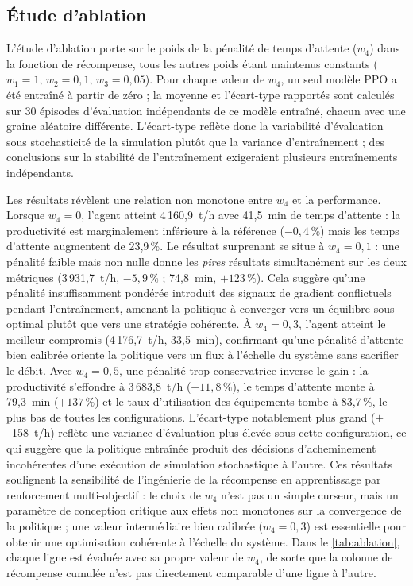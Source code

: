 \documentclass[11pt,a4paper]{article}
\begin{document}
\subsection{Étude d'ablation}
\label{sec:ablation}

L'étude d'ablation porte sur le poids de la pénalité de temps d'attente ($w_4$) dans la fonction de récompense, tous les autres poids étant maintenus constants ($w_1 = 1$, $w_2 = 0{,}1$, $w_3 = 0{,}05$). Pour chaque valeur de $w_4$, un seul modèle PPO a été entraîné à partir de zéro ; la moyenne et l'écart-type rapportés sont calculés sur 30 épisodes d'évaluation indépendants de ce modèle entraîné, chacun avec une graine aléatoire différente. L'écart-type reflète donc la variabilité d'évaluation sous stochasticité de la simulation plutôt que la variance d'entraînement ; des conclusions sur la stabilité de l'entraînement exigeraient plusieurs entraînements indépendants.

Les résultats révèlent une relation non monotone entre $w_4$ et la performance. Lorsque $w_4 = 0$, l'agent atteint 4\,160,9~t/h avec 41,5~min de temps d'attente : la productivité est marginalement inférieure à la référence ($-0{,}4\,\%$) mais les temps d'attente augmentent de 23,9\,\%. Le résultat surprenant se situe à $w_4 = 0{,}1$ : une pénalité faible mais non nulle donne les \emph{pires} résultats simultanément sur les deux métriques (3\,931,7~t/h, $-5{,}9\,\%$ ; 74,8~min, $+123\,\%$). Cela suggère qu'une pénalité insuffisamment pondérée introduit des signaux de gradient conflictuels pendant l'entraînement, amenant la politique à converger vers un équilibre sous-optimal plutôt que vers une stratégie cohérente. À $w_4 = 0{,}3$, l'agent atteint le meilleur compromis (4\,176,7~t/h, 33,5~min), confirmant qu'une pénalité d'attente bien calibrée oriente la politique vers un flux à l'échelle du système sans sacrifier le débit. Avec $w_4 = 0{,}5$, une pénalité trop conservatrice inverse le gain : la productivité s'effondre à 3\,683,8~t/h ($-11{,}8\,\%$), le temps d'attente monte à 79,3~min ($+137\,\%$) et le taux d'utilisation des équipements tombe à 83,7\,\%, le plus bas de toutes les configurations. L'écart-type notablement plus grand ($\pm$~158~t/h) reflète une variance d'évaluation plus élevée sous cette configuration, ce qui suggère que la politique entraînée produit des décisions d'acheminement incohérentes d'une exécution de simulation stochastique à l'autre. Ces résultats soulignent la sensibilité de l'ingénierie de la récompense en apprentissage par renforcement multi-objectif : le choix de $w_4$ n'est pas un simple curseur, mais un paramètre de conception critique aux effets non monotones sur la convergence de la politique ; une valeur intermédiaire bien calibrée ($w_4 = 0{,}3$) est essentielle pour obtenir une optimisation cohérente à l'échelle du système. Dans le \cref{tab:ablation}, chaque ligne est évaluée avec sa propre valeur de $w_4$, de sorte que la colonne de récompense cumulée n'est pas directement comparable d'une ligne à l'autre.
\end{document}
